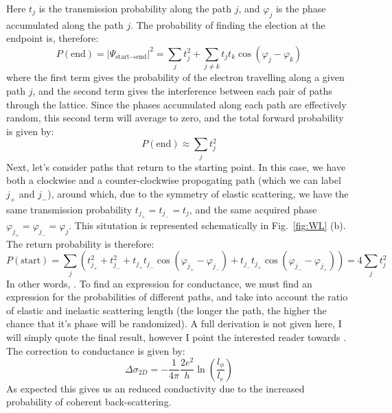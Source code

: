 Here $t_j$ is the transmission probability along the path $j$, and $\varphi_j$ is the phase accumulated along the path $j$.
The probability of finding the election at the endpoint is, therefore:
\begin{equation}
  P(\textrm{end}) = \left|\Psi_{\textrm{start}\rightarrow\textrm{end}}\right|^2 = \sum_j t_j^2 + \sum_{j \neq k} t_jt_k \cos(\varphi_j - \varphi_k)
\end{equation}
where the first term gives the probability of the electron travelling along a given path $j$, and the second term gives the
interference between each pair of paths through the lattice. Since the phases accumulated along each path are effectively random,
this second term will average to zero, and the total forward probability is given by:
\begin{equation}
P(\textrm{end}) \approx \sum_j t_j^2
\end{equation}
Next, let's consider paths that return to the starting point. In this case, we have both a clockwise and a counter-clockwise propogating
path (which we can label $j_+$ and $j_-$), around which, due to the symmetry of elastic scattering, we have the same transmission
probability $t_{j_+} = t_{j_-} = t_j$, and the same acquired phase $\varphi_{j_+} = \varphi_{j_-} = \varphi_j$. This situtation is represented schematically
in Fig.~\ref{fig:WL} (b). The return probability is therefore:
\begin{equation}
  P(\textrm{start}) = \sum_j \left(t_{j_+}^2 + t_{j_-}^2 + t_{j_+}t_{j_-}\cos(\varphi_{j_+} - \varphi_{j_-}) + t_{j_-}t_{j_+}\cos(\varphi_{j_-} - \varphi_{j_+})\right) = 4 \sum_jt_j^2
\end{equation}
In other words, . To find an expression for conductance, we must find an expression for the probabilities of different paths, and take
into account the ratio of elastic and inelastic scattering length (the longer the path, the higher the chance that it's phase will be randomized). A full derivation
is not given here, I will simply quote the final result, however I point the interested reader towards \cite{delftbook,datta1997electronic}. The correction
to conductance is given by:
\begin{equation}
  \Delta \sigma_{2D} = -\frac{1}{4\pi}\frac{2e^2}{h}\ln\left(\frac{l_\phi}{l_e}\right)
\end{equation}
As expected this gives us an reduced conductivity due to the increased probability of coherent back-scattering.

